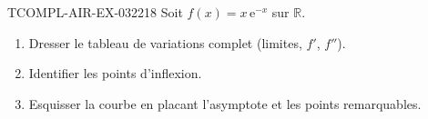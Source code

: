 \begin{exercice}{TCOMPL-AIR-EX-032}{2}{18}
Soit $f(x) = x\,\mathrm{e}^{-x}$ sur $\mathbb{R}$.
\begin{enumerate}
  \item Dresser le tableau de variations complet (limites, $f'$, $f''$).
  \item Identifier les points d'inflexion.
  \item Esquisser la courbe en placant l'asymptote et les points remarquables.
\end{enumerate}

\end{exercice}
